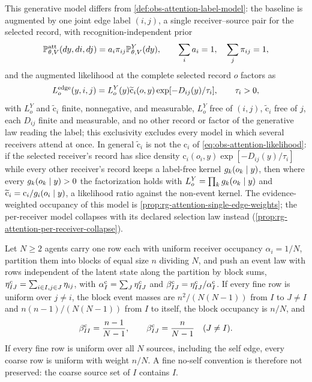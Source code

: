 This generative model differs from \cref{def:obs-attention-label-model}: the
baseline is augmented by one joint edge label \((i,j)\), a single
receiver--source pair for the selected record, with recognition-independent
prior
\begin{equation}
\mathbb P_{\theta,V}^{\rm att}(dy,di,dj)=a_i\pi_{ij}\mathbb P_{\theta,V}^Y(dy),
\qquad
\sum_i a_i=1,
\quad
\sum_j\pi_{ij}=1,
\label{eq:rg-attention-fixed-label-joint}
\end{equation}
and the augmented likelihood at the complete selected record \(o\) factors as
\begin{equation}
L_o^{\rm edge}(y,i,j)
=L_o^Y(y)\widetilde{\mathrm c}_i(o,y)\exp[-D_{ij}(y)/\tau_i],
\qquad\tau_i>0,
\label{eq:rg-attention-single-edge-likelihood}
\end{equation}
with \(L_o^Y\) and \(\widetilde{\mathrm c}_i\) finite, nonnegative, and
measurable, \(L_o^Y\) free of \((i,j)\), \(\widetilde{\mathrm c}_i\) free of
\(j\), each \(D_{ij}\) finite and measurable, and no other record or factor of
the generative law reading the label; this exclusivity excludes every model in
which several receivers attend at once. In general \(\widetilde{\mathrm c}_i\)
is not the \(\mathrm c_i\) of \eqref{eq:obs-attention-likelihood}: if the
selected receiver's record has slice density
\(\mathrm c_i(o_i,y)\exp[-D_{ij}(y)/\tau_i]\) while every other receiver's
record keeps a label-free kernel \(g_k(o_k\mid y)\), then where every
\(g_k(o_k\mid y)>0\) the factorization holds with
\(L_o^Y=\prod_kg_k(o_k\mid y)\) and
\(\widetilde{\mathrm c}_i=\mathrm c_i/g_i(o_i\mid y)\), a likelihood ratio
against the non-event kernel. The evidence-weighted occupancy of this model is
\cref{prop:rg-attention-single-edge-weights}; the per-receiver model collapses
with its declared selection law instead
(\cref{prop:rg-attention-per-receiver-collapse}).

Let \(N\ge2\) agents carry one row each with uniform receiver occupancy
\(\alpha_i=1/N\), partition them into blocks of equal size \(n\) dividing
\(N\), and push an event law with rows independent of the latent state along
the partition by block sums, \(\eta^{\rm c}_{IJ}=\sum_{i\in I,j\in J}\eta_{ij}\),
with \(\alpha^{\rm c}_I=\sum_J\eta^{\rm c}_{IJ}\) and
\(\beta^{\rm c}_{IJ}=\eta^{\rm c}_{IJ}/\alpha^{\rm c}_I\). If every fine row is
uniform over \(j\ne i\), the block event masses are \(n^2/(N(N-1))\) from \(I\)
to \(J\ne I\) and \(n(n-1)/(N(N-1))\) from \(I\) to itself, the block occupancy
is \(n/N\), and
\begin{equation}
\beta^{\rm c}_{II}=\frac{n-1}{N-1},
\qquad
\beta^{\rm c}_{IJ}=\frac{n}{N-1}\quad(J\ne I).
\label{eq:obs-attention-self-edge-coarse-rows}
\end{equation}
If every fine row is uniform over all \(N\) sources, including the self edge,
every coarse row is uniform with weight \(n/N\). A fine no-self convention is
therefore not preserved: the coarse source set of \(I\) contains \(I\).


